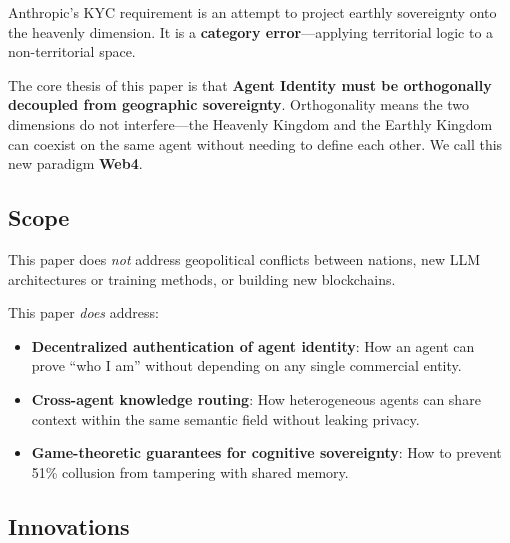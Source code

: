 \documentclass[11pt,a4paper]{article}
\newcommand{\webfour}{Web4}
\begin{document}
Anthropic's KYC requirement is an attempt to project earthly sovereignty onto the heavenly dimension.
It is a \textbf{category error}---applying territorial logic to a non-territorial space.

The core thesis of this paper is that \textbf{Agent Identity must be orthogonally decoupled from geographic sovereignty}.
Orthogonality means the two dimensions do not interfere---the Heavenly Kingdom and the Earthly Kingdom can coexist on the same agent without needing to define each other.
We call this new paradigm \textbf{\webfour}.

\subsection{Scope}
\label{sub:scope}

This paper does \emph{not} address geopolitical conflicts between nations, new LLM architectures or training methods, or building new blockchains.

This paper \emph{does} address:
\begin{itemize}
  \item \textbf{Decentralized authentication of agent identity}: How an agent can prove ``who I am'' without depending on any single commercial entity.
  \item \textbf{Cross-agent knowledge routing}: How heterogeneous agents can share context within the same semantic field without leaking privacy.
  \item \textbf{Game-theoretic guarantees for cognitive sovereignty}: How to prevent 51\% collusion from tampering with shared memory.
\end{itemize}

\subsection{Innovations}
\label{sub:innovations}
\end{document}

